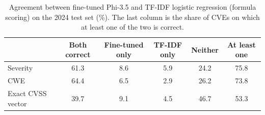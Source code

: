 \begin{table}[t]
\centering
\caption{Agreement between fine-tuned Phi-3.5 and TF-IDF logistic regression (formula scoring) on the 2024 test set (\%). The last column is the share of CVEs on which at least one of the two is correct.}
\label{tab:agreement}
\small
\begin{tabular}{lccccc}
\toprule
 & Both correct & Fine-tuned only & TF-IDF only & Neither & At least one \\
\midrule
Severity & 61.3 & 8.6 & 5.9 & 24.2 & 75.8 \\
CWE & 64.4 & 6.5 & 2.9 & 26.2 & 73.8 \\
Exact CVSS vector & 39.7 & 9.1 & 4.5 & 46.7 & 53.3 \\
\bottomrule
\end{tabular}
\end{table}
